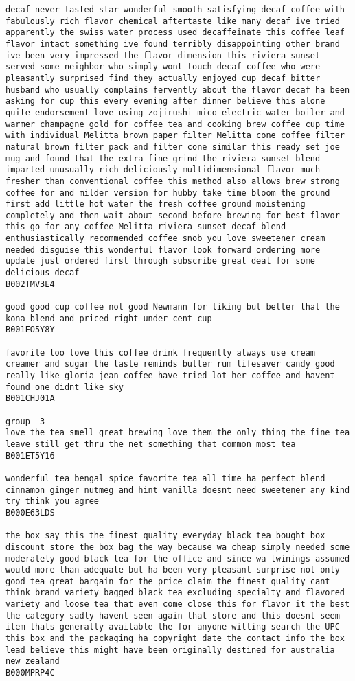 \documentclass[11pt]{article}
\begin{document}
\begin{Verbatim}[commandchars=\\\{\}]
decaf never tasted star wonderful smooth satisfying decaf coffee with fabulously rich flavor chemical aftertaste like many decaf ive tried apparently the swiss water process used decaffeinate this coffee leaf flavor intact something ive found terribly disappointing other brand ive been very impressed the flavor dimension this riviera sunset served some neighbor who simply wont touch decaf coffee who were pleasantly surprised find they actually enjoyed cup decaf bitter husband who usually complains fervently about the flavor decaf ha been asking for cup this every evening after dinner believe this alone quite endorsement love using zojirushi mico electric water boiler and warmer champagne gold for coffee tea and cooking brew coffee cup time with individual Melitta brown paper filter Melitta cone coffee filter natural brown filter pack and filter cone similar this ready set joe mug and found that the extra fine grind the riviera sunset blend imparted unusually rich deliciously multidimensional flavor much fresher than conventional coffee this method also allows brew strong coffee for and milder version for hubby take time bloom the ground first add little hot water the fresh coffee ground moistening completely and then wait about second before brewing for best flavor this go for any coffee Melitta riviera sunset decaf blend enthusiastically recommended coffee snob you love sweetener cream needed disguise this wonderful flavor look forward ordering more update just ordered first through subscribe great deal for some delicious decaf
B002TMV3E4

good good cup coffee not good Newmann for liking but better that the kona blend and priced right under cent cup
B001EO5Y8Y

favorite too love this coffee drink frequently always use cream creamer and sugar the taste reminds butter rum lifesaver candy good really like gloria jean coffee have tried lot her coffee and havent found one didnt like sky
B001CHJ01A

group  3
love the tea smell great brewing love them the only thing the fine tea leave still get thru the net something that common most tea
B001ET5Y16

wonderful tea bengal spice favorite tea all time ha perfect blend cinnamon ginger nutmeg and hint vanilla doesnt need sweetener any kind try think you agree
B000E63LDS

the box say this the finest quality everyday black tea bought box discount store the box bag the way because wa cheap simply needed some moderately good black tea for the office and since wa twinings assumed would more than adequate but ha been very pleasant surprise not only good tea great bargain for the price claim the finest quality cant think brand variety bagged black tea excluding specialty and flavored variety and loose tea that even come close this for flavor it the best the category sadly havent seen again that store and this doesnt seem item thats generally available the for anyone willing search the UPC this box and the packaging ha copyright date the contact info the box lead believe this might have been originally destined for australia new zealand
B000MPRP4C


\end{Verbatim}
\end{document}
